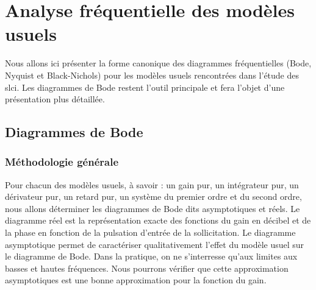 \section{Analyse fréquentielle des modèles usuels}
Nous allons ici présenter la forme canonique des diagrammes fréquentielles 
(Bode, Nyquist et Black-Nichols) pour les modèles usuels rencontrées dans 
l'étude des \gls{slci}. Les diagrammes de Bode restent l'outil principale et 
fera l'objet d'une présentation plus détaillée.
\subsection{Diagrammes de Bode}
\subsubsection{Méthodologie générale}
Pour chacun des modèles usuels, à savoir : un gain pur, un intégrateur pur,
un dérivateur pur, un retard pur, un système du premier ordre et du second 
ordre, nous allons déterminer les diagrammes de Bode dits asymptotiques 
et réels. Le diagramme réel est la représentation exacte des fonctions du gain
en décibel et de la phase en fonction de la pulsation d'entrée de 
la sollicitation. Le diagramme asymptotique permet de caractériser 
qualitativement l'effet du modèle usuel sur le diagramme de Bode. 
Dans la pratique, on ne s'interresse qu'aux limites aux basses et hautes 
fréquences. Nous pourrons vérifier que cette approximation asymptotiques est une
bonne approximation pour la fonction du gain.

